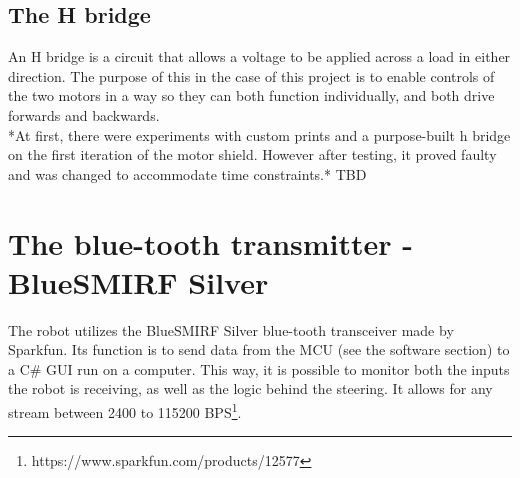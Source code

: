 \subsection{The H bridge}
An H bridge is a circuit that allows a voltage to be applied across a load in either direction. The purpose of this in the case of this project is to enable controls of the two motors in a way so they can both function individually, and both drive forwards and backwards.\\

*At first, there were experiments with custom prints and a purpose-built h bridge on the first iteration of the motor shield. However after testing, it proved faulty and was changed to accommodate time constraints.* TBD

\section{The blue-tooth transmitter - BlueSMIRF Silver}
The robot utilizes the BlueSMIRF Silver blue-tooth transceiver made by Sparkfun. Its function is to send data from the MCU (see the software section) to a C\# GUI run on a computer. This way, it is possible to monitor both the inputs the robot is receiving, as well as the logic behind the steering. It allows for any stream between 2400 to 115200 BPS\footnote{https://www.sparkfun.com/products/12577}. 
